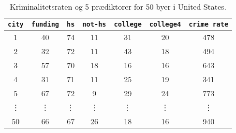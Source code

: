 \begin{table}[H] 
\centering 
\begin{tabular}{c|cccccc} 
\texttt{city} & \texttt{funding} & \texttt{hs} & \texttt{not-hs} & \texttt{college} & \texttt{college4} & \texttt{crime rate} \\
\midrule
1 & 40 & 74 & 11 & 31 & 20 & 478 \\
2 & 32 & 72 & 11 & 43 & 18 & 494 \\
3 & 57 & 70 & 18 & 16 & 16 & 643 \\
4 & 31 & 71 & 11 & 25 & 19 & 341 \\
5 & 67 & 72 & 9 & 29 & 24 & 773 \\
\vdots & \vdots & \vdots & \vdots & \vdots & \vdots & \vdots \\
50 & 66 & 67 & 26 & 18 & 16 & 940 \\
\bottomrule
\end{tabular}  
\caption{Kriminalitetsraten og 5 prædiktorer for 50 byer i United States.} \label{tab:crime} 
\end{table} 